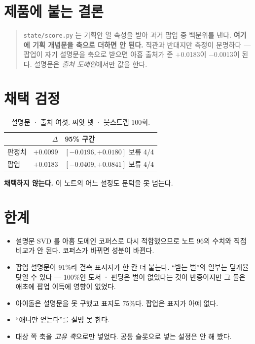 \documentclass[10pt]{article}
\begin{document}

\section{제품에 붙는 결론}

\begin{quote}\fontsize{9.5}{11.5}\selectfont
\texttt{state/score.py} 는 기획안 열 속성을 받아 과거 팝업 중 백분위를 낸다.
\textbf{여기에 기획 개념문을 축으로 더하면 안 된다.} 직관과 반대지만 측정이
분명하다 --- 팝업이 자기 설명문을 축으로 받으면 아홉 출처가 준 $+$0.0183이
$-$0.0013이 된다. 설명문은 \emph{출처 도메인}에서만 값을 한다.
\end{quote}

\section{채택 검정}

\begin{table}[t]
\centering\tsize
\caption{설명문 · 출처 여섯. 씨앗 넷 · 붓스트랩 100회.}
\begin{tabular}{lrl}
\toprule
& $\Delta$ & 95\% 구간 \\
\midrule
판정치 & $+$0.0099 & $[-0.0196, +0.0180]$ \quad 보류 4/4 \\
팝업 & $+$0.0183 & $[-0.0409, +0.0841]$ \quad 보류 4/4 \\
\bottomrule
\end{tabular}
\end{table}

\textbf{채택하지 않는다.} 이 노트의 어느 설정도 문턱을 못 넘는다.

\section{한계}

\begin{itemize}[leftmargin=1.1em,itemsep=0.15em]
\item 설명문 SVD 를 아홉 도메인 코퍼스로 다시 적합했으므로 노트 96의 수치와
      직접 비교가 안 된다. 코퍼스가 바뀌면 성분이 바뀐다.
\item 팝업 설명문이 91\%라 결측 표시자가 한 칸 더 붙는다. ``받는 벌''의 일부는
      덮개율 탓일 수 있다 --- 100\%인 도서 · 펀딩은 벌이 없었다는 것이 반증이지만
      그 둘은 애초에 팝업 이득에 영향이 없었다.
\item 아이돌은 설명문을 못 구했고 표지도 75\%다. 팝업은 표지가 아예 없다.
\item ``애니만 얻는다''를 설명 못 한다.
\item 대상 쪽 축을 \emph{고유 축}으로만 넣었다. 공통 슬롯으로 넣는 설정은 안
      해 봤다.
\end{itemize}
\end{document}
